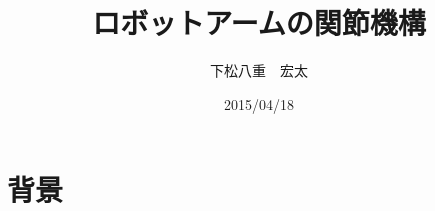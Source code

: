 \documentclass[11pt,a4j]{jarticle}
\title {ロボットアームの関節機構}
\author {下松八重　宏太}
\date {2015/04/18}
\begin{document}
\maketitle

\section{背景}
\end{document}
